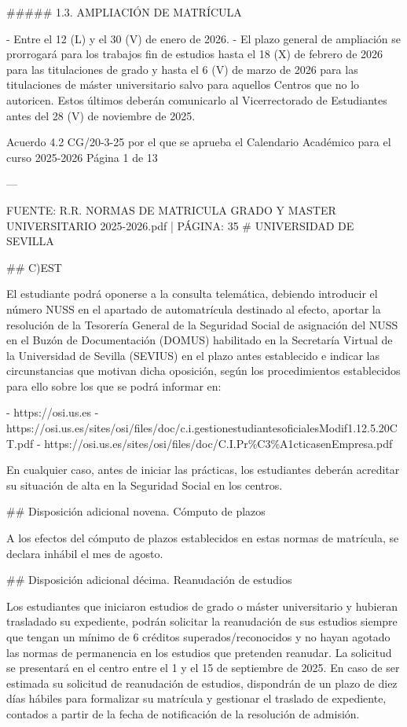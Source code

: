 \documentclass{article}
\begin{document}
\begin{itemize}
\begin{itemize}
\begin{scriptsize}
                  \#\#\#\#\# 1.3. AMPLIACIÓN DE MATRÍCULA

                  - Entre el 12 (L) y el 30 (V) de enero de 2026.
                  - El plazo general de ampliación se prorrogará para los trabajos fin de estudios hasta el 18 (X) de febrero de 2026 para las titulaciones de grado y hasta el 6 (V) de marzo de 2026 para las titulaciones de máster universitario salvo para aquellos Centros que no lo autoricen. Estos últimos deberán comunicarlo al Vicerrectorado de Estudiantes antes del 28 (V) de noviembre de 2025.

                  Acuerdo 4.2 CG/20-3-25 por el que se aprueba el Calendario Académico para el curso 2025-2026  Página 1 de 13

                  ---

                  FUENTE: R.R. NORMAS DE MATRICULA GRADO Y MASTER UNIVERSITARIO 2025-2026.pdf | PÁGINA: 35
                  \# UNIVERSIDAD DE SEVILLA

                  \#\# C)EST

                  El estudiante podrá oponerse a la consulta telemática, debiendo introducir el número NUSS en el apartado de automatrícula destinado al efecto, aportar la resolución de la Tesorería General de la Seguridad Social de asignación del NUSS en el Buzón de Documentación (DOMUS) habilitado en la Secretaría Virtual de la Universidad de Sevilla (SEVIUS) en el plazo antes establecido e indicar las circunstancias que motivan dicha oposición, según los procedimientos establecidos para ello sobre los que se podrá informar en:

                  - https://osi.us.es
                  - https://osi.us.es/sites/osi/files/doc/c.i.gestionestudiantesoficialesModif1.12.5.20CT.pdf
                  - https://osi.us.es/sites/osi/files/doc/C.I.Pr\%C3\%A1cticasenEmpresa.pdf

                  En cualquier caso, antes de iniciar las prácticas, los estudiantes deberán acreditar su situación de alta en la Seguridad Social en los centros.

                  \#\# Disposición adicional novena. Cómputo de plazos

                  A los efectos del cómputo de plazos establecidos en estas normas de matrícula, se declara inhábil el mes de agosto.

                  \#\# Disposición adicional décima. Reanudación de estudios

                  Los estudiantes que iniciaron estudios de grado o máster universitario y hubieran trasladado su expediente, podrán solicitar la reanudación de sus estudios siempre que tengan un mínimo de 6 créditos superados/reconocidos y no hayan agotado las normas de permanencia en los estudios que pretenden reanudar. La solicitud se presentará en el centro entre el 1 y el 15 de septiembre de 2025. En caso de ser estimada su solicitud de reanudación de estudios, dispondrán de un plazo de diez días hábiles para formalizar su matrícula y gestionar el traslado de expediente, contados a partir de la fecha de notificación de la resolución de admisión.


\end{scriptsize}
\end{itemize}
\end{itemize}
\end{document}
